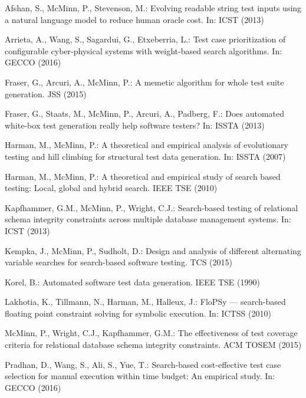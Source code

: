 \documentclass{llncs}
\begin{document}
\begin{thebibliography}{10}
\providecommand{\url}[1]{\texttt{#1}}
\providecommand{\urlprefix}{URL }

\scriptsize

Afshan, S., McMinn, P., Stevenson, M.: Evolving readable string test inputs
	using a natural language model to reduce human oracle cost. In: ICST (2013)

Arrieta, A., Wang, S., Sagardui, G., Etxeberria, L.: Test case prioritization
	of configurable cyber-physical systems with weight-based search algorithms.
	In: GECCO (2016)

Fraser, G., Arcuri, A., McMinn, P.: A memetic algorithm for whole test suite
	generation. JSS  (2015)

Fraser, G., Staats, M., McMinn, P., Arcuri, A., Padberg, F.: Does automated
	white-box test generation really help software testers? In: ISSTA (2013)

Harman, M., McMinn, P.: A theoretical and empirical analysis of evolutionary
	testing and hill climbing for structural test data generation. In: ISSTA
	(2007)

Harman, M., McMinn, P.: A theoretical and empirical study of search based
	testing: Local, global and hybrid search. IEEE TSE  (2010)

Kapfhammer, G.M., McMinn, P., Wright, C.J.: Search-based testing of relational
	schema integrity constraints across multiple database management systems. In:
	ICST (2013)

Kempka, J., McMinn, P., Sudholt, D.: Design and analysis of different
	alternating variable searches for search-based software testing. TCS  (2015)

Korel, B.: Automated software test data generation. IEEE TSE  (1990)

Lakhotia, K., Tillmann, N., Harman, M., Halleux, J.: {FloPSy} --- search-based
	floating point constraint solving for symbolic execution. In: ICTSS (2010)

McMinn, P., Wright, C.J., Kapfhammer, G.M.: The effectiveness of test coverage
	criteria for relational database schema integrity constraints. ACM TOSEM
	(2015)

Pradhan, D., Wang, S., Ali, S., Yue, T.: Search-based cost-effective test case
	selection for manual execution within time budget: An empirical study. In:
	GECCO (2016)


\end{thebibliography}
\end{document}
